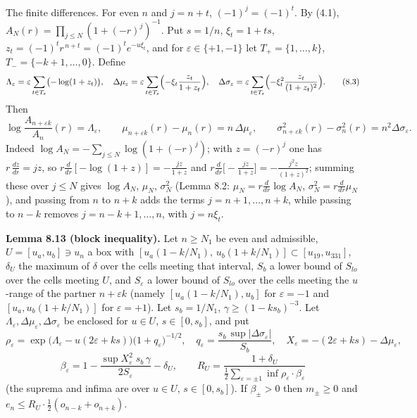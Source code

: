 The finite differences. For even \(n\) and \(j=n+t\), \((-1)^j=(-1)^t\). By (4.1), \(A_N(r)=\prod_{j\le N}(1+(-r)^j)^{-1}\). Put \(s=1/n\), \(\xi_t=1+ts\), \(z_t=(-1)^tr^{\,n+t}=(-1)^te^{-u\xi_t}\), and for \(\varepsilon\in\{+1,-1\}\) let \(T_{+}=\{1,\dots,k\}\), \(T_{-}=\{-k+1,\dots,0\}\). Define
\[\Lambda_\varepsilon=\varepsilon\sum_{t\in T_\varepsilon}\bigl(-\log(1+z_t)\bigr),\quad\Delta\mu_\varepsilon=\varepsilon\sum_{t\in T_\varepsilon}\Bigl(-\xi_t\frac{z_t}{1+z_t}\Bigr),\quad\Delta\sigma_\varepsilon=\varepsilon\sum_{t\in T_\varepsilon}\Bigl(-\xi_t^2\frac{z_t}{(1+z_t)^2}\Bigr).\tag{8.3}\]
Then
\[\log\frac{A_{n+\varepsilon k}}{A_n}(r)=\Lambda_\varepsilon,\qquad\mu_{n+\varepsilon k}(r)-\mu_n(r)=n\,\Delta\mu_\varepsilon,\qquad\sigma^2_{n+\varepsilon k}(r)-\sigma_n^2(r)=n^2\Delta\sigma_\varepsilon .\tag{8.4}\]
Indeed \(\log A_N=-\sum_{j\le N}\log(1+(-r)^j)\); with \(z=(-r)^j\) one has \(r\,\frac{dz}{dr}=jz\), so \(r\frac d{dr}[-\log(1+z)]=-\frac{jz}{1+z}\) and \(r\frac d{dr}\bigl[-\frac{jz}{1+z}\bigr]=-\frac{j^2z}{(1+z)^2}\); summing these over \(j\le N\) gives \(\log A_N\), \(\mu_N\), \(\sigma_N^2\) (Lemma 8.2: \(\mu_N=r\frac d{dr}\log A_N\), \(\sigma_N^2=r\frac d{dr}\mu_N\)), and passing from \(n\) to \(n+k\) adds the terms \(j=n+1,\dots,n+k\), while passing to \(n-k\) removes \(j=n-k+1,\dots,n\), with \(j=n\xi_t\).

\textbf{Lemma 8.13 (block inequality).} Let \(n\ge N_1\) be even and admissible, \(U=[u_a,u_b]\ni u_n\) a box with \([u_a(1-k/N_1),\,u_b(1+k/N_1)]\subset[u_{19},u_{331}]\), \(\delta_U\) the maximum of \(\delta\) over the cells meeting that interval, \(S_b\) a lower bound of \(S_{lo}\) over the cells meeting \(U\), and \(S_\varepsilon\) a lower bound of \(S_{lo}\) over the cells meeting the \(u\)-range of the partner \(n+\varepsilon k\) (namely \([u_a(1-k/N_1),u_b]\) for \(\varepsilon=-1\) and \([u_a,u_b(1+k/N_1)]\) for \(\varepsilon=+1\)). Let \(s_b=1/N_1\), \(\gamma\ge(1-ks_b)^{-3}\). Let \(\Lambda_\varepsilon,\Delta\mu_\varepsilon,\Delta\sigma_\varepsilon\) be enclosed for \(u\in U\), \(s\in[0,s_b]\), and put
\[\rho_\varepsilon=\exp\!\bigl(\Lambda_\varepsilon-u(2\varepsilon+ks)\bigr)\bigl(1+q_\varepsilon\bigr)^{-1/2},\quad q_\varepsilon=\frac{s_b\,\sup|\Delta\sigma_\varepsilon|}{S_b},\quad X_\varepsilon=-(2\varepsilon+ks)-\Delta\mu_\varepsilon,\]
\[\beta_\varepsilon=1-\frac{\sup X_\varepsilon^2\;s_b\,\gamma}{2S_\varepsilon}-\delta_U,\qquad R_U=\frac{1+\delta_U}{\frac12\sum_{\varepsilon=\pm1}\inf\rho_\varepsilon\cdot\beta_\varepsilon}\]
(the suprema and infima are over \(u\in U\), \(s\in[0,s_b]\)). If \(\beta_\pm>0\) then \(m_\pm\ge0\) and \(e_n\le R_U\cdot\frac12(o_{n-k}+o_{n+k})\).


